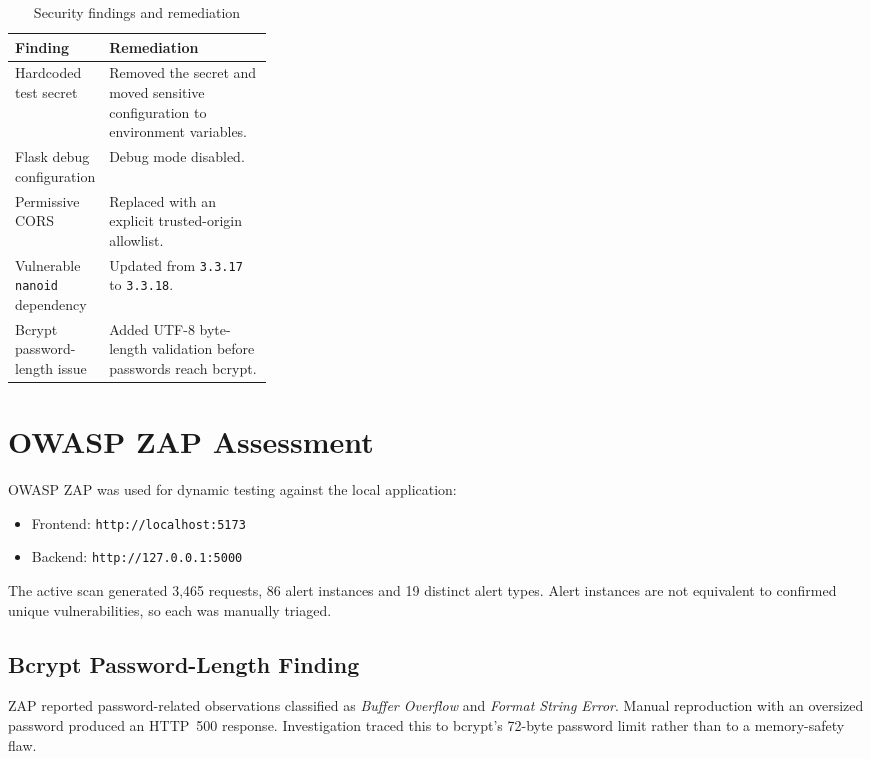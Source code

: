 \documentclass[11pt,a4paper]{article}
\newcommand{\tablehead}{\rowcolor{LightBlue}}
\begin{document}
\begin{table}[htbp]
\centering
\renewcommand{\arraystretch}{1.45}
\begin{tabularx}{\linewidth}{@{}L{0.30\linewidth}X@{}}
\toprule
\tablehead \textbf{Finding} & \textbf{Remediation} \\
\midrule
Hardcoded test secret & Removed the secret and moved sensitive configuration to environment variables. \\
Flask debug configuration & Debug mode disabled. \\
Permissive CORS & Replaced with an explicit trusted-origin allowlist. \\
Vulnerable \texttt{nanoid} dependency & Updated from \texttt{3.3.17} to \texttt{3.3.18}. \\
Bcrypt password-length issue & Added UTF-8 byte-length validation before passwords reach bcrypt. \\
\bottomrule
\end{tabularx}
\caption{Security findings and remediation}
\end{table}

\section{OWASP ZAP Assessment}

OWASP ZAP was used for dynamic testing against the local application:

\begin{itemize}[leftmargin=*]
\item Frontend: \texttt{http://localhost:5173}
\item Backend: \texttt{http://127.0.0.1:5000}
\end{itemize}

The active scan generated 3,465 requests, 86 alert instances and 19 distinct alert types. Alert instances are not equivalent to confirmed unique vulnerabilities, so each was manually triaged.

\subsection{Bcrypt Password-Length Finding}

ZAP reported password-related observations classified as \emph{Buffer Overflow} and \emph{Format String Error}. Manual reproduction with an oversized password produced an HTTP~500 response. Investigation traced this to bcrypt's 72-byte password limit rather than to a memory-safety flaw.
\end{document}
